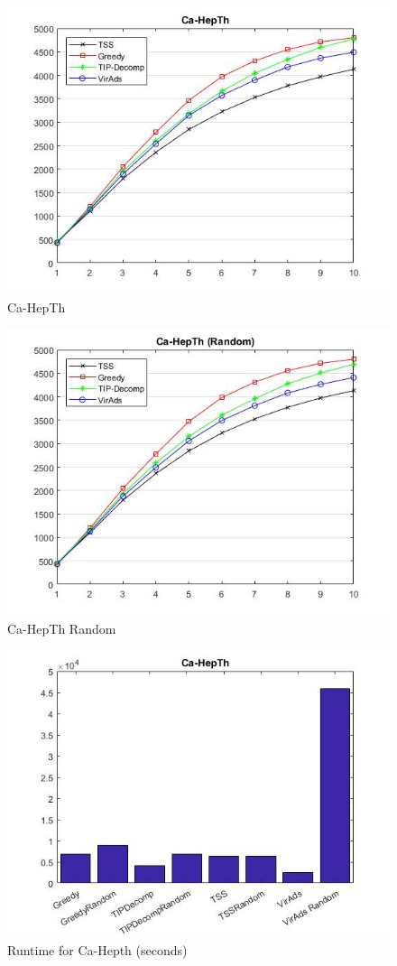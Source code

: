 \begin{figure}
	\centering
	\includegraphics[scale=0.5]{images/ca-hepthresult.jpg}
	\caption{Ca-HepTh}
\end{figure}
\begin{figure}
	\centering	
	\includegraphics[scale=0.5]{images/ca-hepthresultrandom.jpg}
	\caption{Ca-HepTh Random}
\end{figure}
\begin{figure}
	\centering
	\includegraphics[scale=0.5]{images/hepthtime.jpg}
	\caption{Runtime for Ca-Hepth (seconds)}
\end{figure}
	
	
